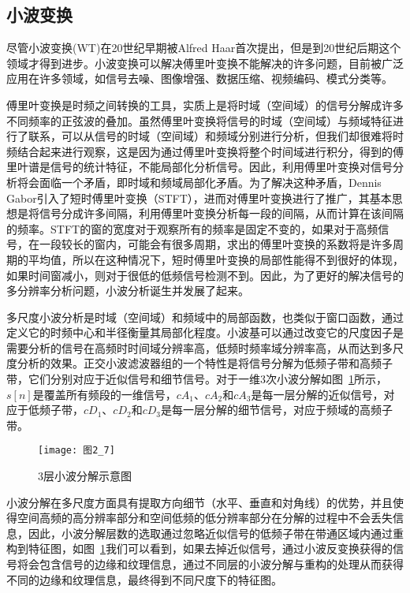 \subsection{小波变换}
\label{2_2_3}

尽管小波变换(WT)在20世纪早期被Alfred Haar首次提出，但是到20世纪后期这个领域才得到进步\cite{Merry2013wavelet}。小波变换可以解决傅里叶变换不能解决的许多问题，目前被广泛应用在许多领域，如信号去噪、图像增强、数据压缩、视频编码、模式分类等\cite{ImamogluTMM2013wavelet}。

傅里叶变换是时频之间转换的工具，实质上是将时域（空间域）的信号分解成许多不同频率的正弦波的叠加。虽然傅里叶变换将信号的时域（空间域）与频域特征进行了联系，可以从信号的时域（空间域）和频域分别进行分析，但我们却很难将时频结合起来进行观察，这是因为通过傅里叶变换将整个时间域进行积分，得到的傅里叶谱是信号的统计特征，不能局部化分析信号。因此，利用傅里叶变换对信号分析将会面临一个矛盾，即时域和频域局部化矛盾\cite{Merry2013wavelet,Fugal2009book,Kocyigit2013EMG,Semmlow2004book}。为了解决这种矛盾，Dennis Gabor引入了短时傅里叶变换（STFT），进而对傅里叶变换进行了推广，其基本思想是将信号分成许多间隔，利用傅里叶变换分析每一段的间隔，从而计算在该间隔的频率。STFT的窗的宽度对于观察所有的频率是固定不变的，如果对于高频信号，在一段较长的窗内，可能会有很多周期，求出的傅里叶变换的系数将是许多周期的平均值，所以在这种情况下，短时傅里叶变换的局部性能得不到很好的体现，如果时间窗减小，则对于很低的低频信号检测不到。因此，为了更好的解决信号的多分辨率分析问题，小波分析诞生并发展了起来。

多尺度小波分析是时域（空间域）和频域中的局部函数，也类似于窗口函数，通过定义它的时频中心和半径衡量其局部化程度。小波基可以通过改变它的尺度因子是需要分析的信号在高频时时间域分辨率高，低频时频率域分辨率高，从而达到多尺度分析的效果。正交小波滤波器组的一个特性是将信号分解为低频子带和高频子带，它们分别对应于近似信号和细节信号。对于一维3次小波分解如图~\ref{图2_7}所示\cite{Fugal2009book}，$s[n]$是覆盖所有频段的一维信号，$cA_{1}$、$cA_{2}$和$cA_{3}$是每一层分解的近似信号，对应于低频子带，$cD_{1}$、$cD_{2}$和$cD_{3}$是每一层分解的细节信号，对应于频域的高频子带。
\begin{figure}[t] %
  \centering
  \texttt{[image: 图2\_7]}
  \caption{3层小波分解示意图}
  \label{图2_7}
\end{figure}

小波分解在多尺度方面具有提取方向细节（水平、垂直和対角线）的优势\cite{Merry2013wavelet,Semmlow2004book}，并且使得空间高频的高分辨率部分和空间低频的低分辨率部分在分解的过程中不会丢失信息，因此，小波分解层数的选取通过忽略近似信号的低频子带在带通区域内通过重构到特征图，如图~\ref{图2_7}我们可以看到，如果去掉近似信号，通过小波反变换获得的信号将会包含信号的边缘和纹理信息，通过不同层的小波分解与重构的处理从而获得不同的边缘和纹理信息，最终得到不同尺度下的特征图。

